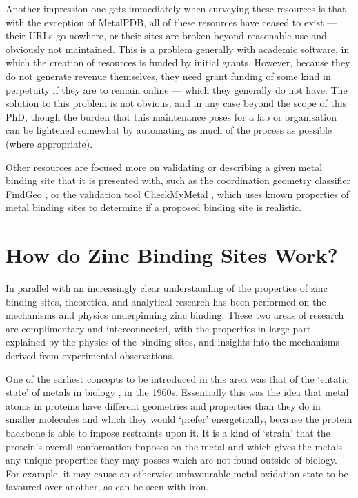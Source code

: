 Another impression one gets immediately when surveying these resources is that with the exception of MetalPDB, all of these resources have ceased to exist --- their URLs go nowhere, or their sites are broken beyond reasonable use and obviously not maintained. This is a problem generally with academic software, in which the creation of resources is funded by initial grants. However, because they do not generate revenue themselves, they need grant funding of some kind in perpetuity if they are to remain online --- which they generally do not have. The solution to this problem is not obvious, and in any case beyond the scope of this PhD, though the burden that this maintenance poses for a lab or organisation can be lightened somewhat by automating as much of the process as possible (where appropriate).

Other resources are focused more on validating or describing a given metal binding site that it is presented with, such as the coordination geometry classifier FindGeo \cite{andreini2012findgeo}, or the validation tool CheckMyMetal \cite{zheng2017checkmymetal}, which uses known properties of metal binding sites to determine if a proposed binding site is realistic.

\section{How do Zinc Binding Sites Work?}

In parallel with an increasingly clear understanding of the properties of zinc binding sites, theoretical and analytical research has been performed on the mechanisms and physics underpinning zinc binding. These two areas of research are complimentary and interconnected, with the properties in large part explained by the physics of the binding sites, and insights into the mechanisms derived from experimental observations.

One of the earliest concepts to be introduced in this area was that of the `entatic state' of metals in biology \cite{vallee1968metalloenzymes}, in the 1960s. Essentially this was the idea that metal atoms in proteins have different geometries and properties than they do in smaller molecules and which they would `prefer' energetically, because the protein backbone is able to impose restraints upon it. It is a kind of `strain' that the protein's overall conformation imposes on the metal and which gives the metals any unique properties they may posses which are not found outside of biology. For example, it may cause an otherwise unfavourable metal oxidation state to be favoured over another, as can be seen with iron.

